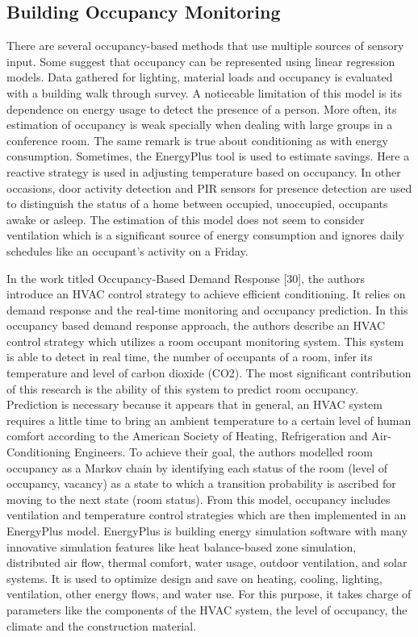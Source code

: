 \subsection{Building Occupancy Monitoring}
There are several occupancy-based methods that use multiple sources of sensory input. Some suggest that occupancy can be represented using linear regression models. Data gathered for lighting, material loads and occupancy is evaluated with a building walk through survey. A noticeable limitation of this model is its dependence on energy usage to detect the presence of a person. More often, its estimation of occupancy is weak specially when dealing with large groups in a conference room. The same remark is true about conditioning as with energy consumption. Sometimes, the EnergyPlus tool is used to estimate savings. Here a reactive strategy is used in adjusting temperature based on occupancy. In other occasions, door activity detection and PIR sensors for presence detection are used to distinguish the status of a home between occupied, unoccupied, occupants awake or asleep. The estimation of this model does not seem to consider ventilation which is a significant source of energy consumption and ignores daily schedules like an occupant’s activity on a Friday.

In the work titled Occupancy-Based Demand Response [30], the authors introduce an HVAC control strategy to achieve efficient conditioning. It relies on demand response and the real-time monitoring and occupancy prediction. In this occupancy based demand response approach, the authors describe an HVAC control strategy which utilizes a room occupant monitoring system. This system is able to detect in real time, the number of occupants of a room, infer its temperature and level of carbon dioxide (CO2). The most significant contribution of this research is the ability of this system to predict room occupancy. Prediction is necessary because it appears that in general, an HVAC system requires a little time to bring an ambient temperature to a certain level of human comfort according to the American Society of Heating, Refrigeration and Air-Conditioning Engineers. To achieve their goal, the authors  modelled room occupancy as a Markov chain by identifying each status of the room (level of occupancy, vacancy) as a state to which a transition probability is ascribed for moving to the next state (room status). From this model, occupancy includes ventilation and temperature control strategies which are then implemented in an EnergyPlus model. EnergyPlus is building energy simulation software with many innovative simulation features like heat balance-based zone simulation, distributed air flow, thermal comfort, water usage, outdoor ventilation, and solar systems. It is used to optimize design and save on heating, cooling, lighting, ventilation, other energy flows, and water use. For this purpose, it takes charge of parameters like the components of the HVAC system, the level of occupancy, the climate and the construction material.


